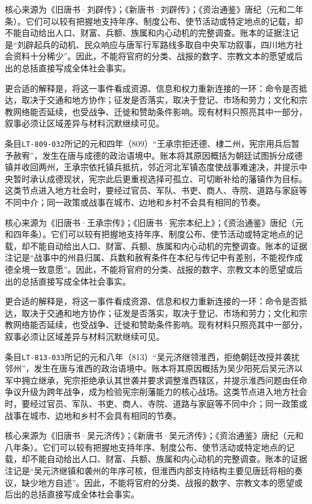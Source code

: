 核心来源为《旧唐书·刘辟传》；《新唐书·刘辟传》；《资治通鉴》唐纪（元和二年条）。它们可以较有把握地支持年序、制度公布、使节活动或特定地点的记载，却不能自动给出人口、财富、兵额、族属和内心动机的完整调查。账本的证据注记是“刘辟起兵的动机、民众响应与唐军行军路线多取自中央军功叙事，四川地方社会资料十分稀少”。因此，不能将官府的分类、战报的数字、宗教文本的愿望或后出的总括直接写成全体社会事实。

更合适的解释是，将这一事件看成资源、信息和权力重新连接的一环：命令是否抵达，取决于交通和地方协作；征发是否落实，取决于登记、市场和劳力；文化和宗教网络能否延续，也受战争、迁徙和赞助条件影响。现有材料只照亮其中一部分，叙事必须让区域差异与材料沉默继续可见。

条目\texttt{LT-809-032}所记的元和四年（809）“王承宗拒还德、棣二州，宪宗用兵后暂予赦宥”，发生在唐与成德的政治语境中。账本将其原因概括为朝廷试图拆分成德镇并收回两州，王承宗依托镇兵抵抗，邻近河北军镇态度使战事难速决，并提示中央暂时承认成德现状，宪宗此后更重视选择可孤立、可切断补给的藩镇作为目标。这类节点进入地方社会时，要经过官员、军队、书吏、商人、寺院、道路与家庭等不同中介；同一政策或战事在城市、边地和乡村不会具有相同的节奏。

核心来源为《旧唐书·王承宗传》；《旧唐书·宪宗本纪上》；《资治通鉴》唐纪（元和四年条）。它们可以较有把握地支持年序、制度公布、使节活动或特定地点的记载，却不能自动给出人口、财富、兵额、族属和内心动机的完整调查。账本的证据注记是“战事中的州县归属、兵数和赦宥条件在本纪与传记中有差别，不能视作成德全境一致意愿”。因此，不能将官府的分类、战报的数字、宗教文本的愿望或后出的总括直接写成全体社会事实。

更合适的解释是，将这一事件看成资源、信息和权力重新连接的一环：命令是否抵达，取决于交通和地方协作；征发是否落实，取决于登记、市场和劳力；文化和宗教网络能否延续，也受战争、迁徙和赞助条件影响。现有材料只照亮其中一部分，叙事必须让区域差异与材料沉默继续可见。

条目\texttt{LT-813-033}所记的元和八年（813）“吴元济继领淮西，拒绝朝廷改授并袭扰邻州”，发生在唐与淮西的政治语境中。账本将其原因概括为吴少阳死后吴元济以军中拥立继承，宪宗拒绝承认其世袭并要求调整淮西辖区，并提示淮西问题由任命争议升级为跨年战争，成为检验宪宗削藩能力的核心战场。这类节点进入地方社会时，要经过官员、军队、书吏、商人、寺院、道路与家庭等不同中介；同一政策或战事在城市、边地和乡村不会具有相同的节奏。

核心来源为《旧唐书·吴元济传》；《新唐书·吴元济传》；《资治通鉴》唐纪（元和八年条）。它们可以较有把握地支持年序、制度公布、使节活动或特定地点的记载，却不能自动给出人口、财富、兵额、族属和内心动机的完整调查。账本的证据注记是“吴元济继镇和袭州的年序可核，但淮西内部支持结构主要见唐廷将相的奏议，缺少地方自述”。因此，不能将官府的分类、战报的数字、宗教文本的愿望或后出的总括直接写成全体社会事实。

